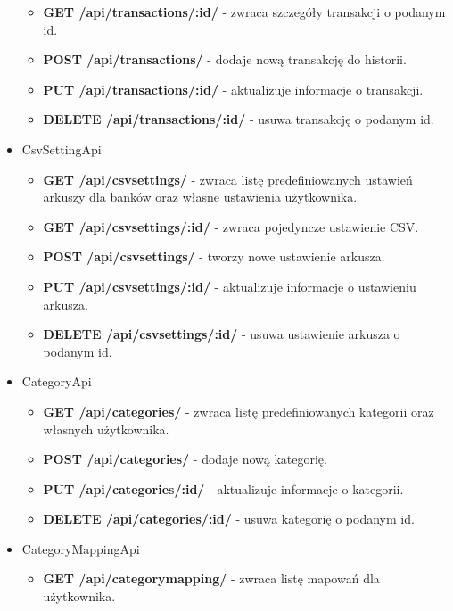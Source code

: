 \documentclass{article}
\begin{document}
\begin{itemize}
\begin{itemize}
				\item \textbf{GET /api/transactions/:id/} - zwraca szczegóły transakcji o podanym id.
				
				\item \textbf{POST /api/transactions/} - dodaje nową transakcję do historii.
				
				\item \textbf{PUT /api/transactions/:id/} - aktualizuje informacje o transakcji.
				
				\item \textbf{DELETE /api/transactions/:id/} - usuwa transakcję o podanym id.
			\end{itemize}
		\item CsvSettingApi
			\begin{itemize}
				\item \textbf{GET /api/csvsettings/} - zwraca listę predefiniowanych ustawień arkuszy dla banków oraz własne ustawienia użytkownika.
				
				\item \textbf{GET /api/csvsettings/:id/} - zwraca pojedyncze ustawienie CSV.
				
				\item \textbf{POST /api/csvsettings/} - tworzy nowe ustawienie arkusza.
				
				\item \textbf{PUT /api/csvsettings/:id/} - aktualizuje informacje o ustawieniu arkusza.
				
				\item \textbf{DELETE /api/csvsettings/:id/} - usuwa ustawienie arkusza o podanym id.
			\end{itemize}
		\item CategoryApi
			\begin{itemize}
				\item \textbf{GET /api/categories/} - zwraca listę predefiniowanych kategorii oraz własnych użytkownika.
				
				\item \textbf{POST /api/categories/} - dodaje nową kategorię.
				
				\item \textbf{PUT /api/categories/:id/} - aktualizuje informacje o kategorii.
				
				\item \textbf{DELETE /api/categories/:id/} - usuwa kategorię o podanym id.
			\end{itemize}
		\item CategoryMappingApi
			\begin{itemize}
				\item \textbf{GET /api/categorymapping/} - zwraca listę mapowań dla użytkownika.
				

\end{itemize}
\end{itemize}
\end{document}

